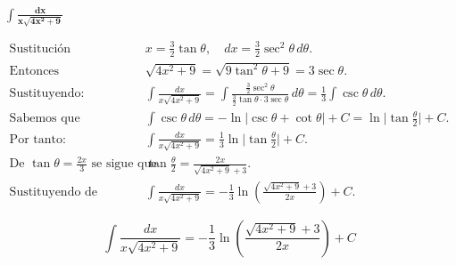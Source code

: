 $\displaystyle \mathbf{\int \frac{dx}{x\sqrt{4x^{2}+9}}}$

\nopagebreak
\begin{align*}
\text{Sustitución trigonométrica: } 
&x = \tfrac{3}{2}\tan\theta, \quad dx = \tfrac{3}{2}\sec^{2}\theta\,d\theta. \\[4pt]
\text{Entonces } 
&\sqrt{4x^{2}+9} = \sqrt{9\tan^{2}\theta + 9} = 3\sec\theta. \\[4pt]
\text{Sustituyendo: } 
&\int \frac{dx}{x\sqrt{4x^{2}+9}}
= \int \frac{\tfrac{3}{2}\sec^{2}\theta}{\tfrac{3}{2}\tan\theta \cdot 3\sec\theta}\,d\theta
= \tfrac{1}{3}\int \csc\theta\,d\theta. \\[4pt]
\text{Sabemos que } 
&\int \csc\theta\,d\theta = -\ln\!\big|\csc\theta+\cot\theta\big| + C
= \ln\!\big|\tan\tfrac{\theta}{2}\big| + C. \\[4pt]
\text{Por tanto: } 
&\int \frac{dx}{x\sqrt{4x^{2}+9}}
= \tfrac{1}{3}\ln\!\big|\tan\tfrac{\theta}{2}\big| + C. \\[4pt]
\text{De } \tan\theta = \tfrac{2x}{3} \text{ se sigue que } 
&\tan\tfrac{\theta}{2} = \tfrac{2x}{\sqrt{4x^{2}+9}+3}. \\[4pt]
\text{Sustituyendo de nuevo: } 
&\int \frac{dx}{x\sqrt{4x^{2}+9}}
= -\tfrac{1}{3}\ln\!\left(\frac{\sqrt{4x^{2}+9}+3}{2x}\right) + C.
\end{align*}

$$
\boxed{\displaystyle 
\int \frac{dx}{x\sqrt{4x^{2}+9}}
= -\frac{1}{3}\ln\!\left(\frac{\sqrt{4x^{2}+9}+3}{2x}\right) + C}
$$
